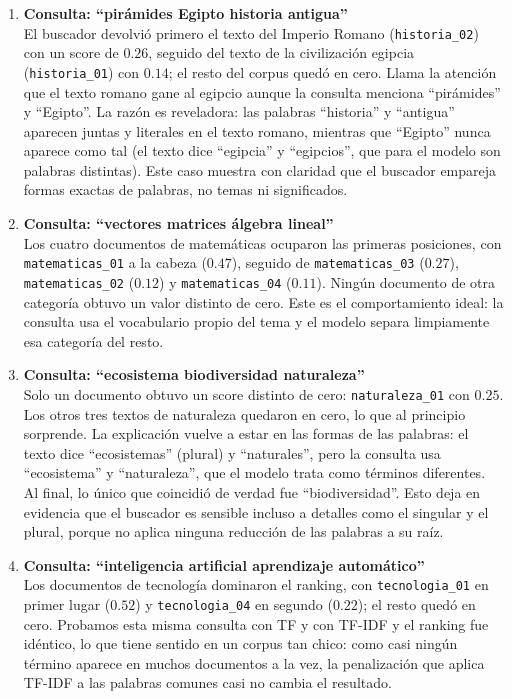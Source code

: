 \documentclass[12pt,a4paper]{article}
\begin{document}
\begin{enumerate}

    \item \textbf{Consulta: ``pirámides Egipto historia antigua''} \\
    El buscador devolvió primero el texto del Imperio Romano (\texttt{historia\_02}) con un score de $0.26$, seguido del texto de la civilización egipcia (\texttt{historia\_01}) con $0.14$; el resto del corpus quedó en cero. Llama la atención que el texto romano gane al egipcio aunque la consulta menciona ``pirámides'' y ``Egipto''. La razón es reveladora: las palabras ``historia'' y ``antigua'' aparecen juntas y literales en el texto romano, mientras que ``Egipto'' nunca aparece como tal (el texto dice ``egipcia'' y ``egipcios'', que para el modelo son palabras distintas). Este caso muestra con claridad que el buscador empareja formas exactas de palabras, no temas ni significados.

    \item \textbf{Consulta: ``vectores matrices álgebra lineal''} \\
    Los cuatro documentos de matemáticas ocuparon las primeras posiciones, con \texttt{matematicas\_01} a la cabeza ($0.47$), seguido de \texttt{matematicas\_03} ($0.27$), \texttt{matematicas\_02} ($0.12$) y \texttt{matematicas\_04} ($0.11$). Ningún documento de otra categoría obtuvo un valor distinto de cero. Este es el comportamiento ideal: la consulta usa el vocabulario propio del tema y el modelo separa limpiamente esa categoría del resto.

    \item \textbf{Consulta: ``ecosistema biodiversidad naturaleza''} \\
    Solo un documento obtuvo un score distinto de cero: \texttt{naturaleza\_01} con $0.25$. Los otros tres textos de naturaleza quedaron en cero, lo que al principio sorprende. La explicación vuelve a estar en las formas de las palabras: el texto dice ``ecosistemas'' (plural) y ``naturales'', pero la consulta usa ``ecosistema'' y ``naturaleza'', que el modelo trata como términos diferentes. Al final, lo único que coincidió de verdad fue ``biodiversidad''. Esto deja en evidencia que el buscador es sensible incluso a detalles como el singular y el plural, porque no aplica ninguna reducción de las palabras a su raíz.

    \item \textbf{Consulta: ``inteligencia artificial aprendizaje automático''} \\
    Los documentos de tecnología dominaron el ranking, con \texttt{tecnologia\_01} en primer lugar ($0.52$) y \texttt{tecnologia\_04} en segundo ($0.22$); el resto quedó en cero. Probamos esta misma consulta con TF y con TF-IDF y el ranking fue idéntico, lo que tiene sentido en un corpus tan chico: como casi ningún término aparece en muchos documentos a la vez, la penalización que aplica TF-IDF a las palabras comunes casi no cambia el resultado.


\end{enumerate}
\end{document}
